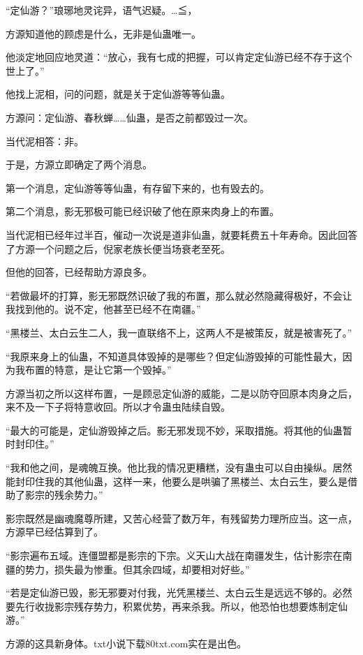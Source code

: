 
\begin{this_body}

“定仙游？”琅琊地灵诧异，语气迟疑。…≦，

方源知道他的顾虑是什么，无非是仙蛊唯一。

他淡定地回应地灵道：“放心，我有七成的把握，可以肯定定仙游已经不存于这个世上了。”

他找上泥相，问的问题，就是关于定仙游等等仙蛊。

方源问：定仙游、春秋蝉……仙蛊，是否之前都毁过一次。

当代泥相答：非。

于是，方源立即确定了两个消息。

第一个消息，定仙游等等仙蛊，有存留下来的，也有毁去的。

第二个消息，影无邪极可能已经识破了他在原来肉身上的布置。

当代泥相已经年过半百，催动一次说是道非仙蛊，就要耗费五十年寿命。因此回答了方源一个问题之后，倪家老族长便当场衰老至死。

但他的回答，已经帮助方源良多。

“若做最坏的打算，影无邪既然识破了我的布置，那么就必然隐藏得极好，不会让我找到他的。说不定，他甚至已经不在南疆。”

“黑楼兰、太白云生二人，我一直联络不上，这两人不是被策反，就是被害死了。”

“我原来身上的仙蛊，不知道具体毁掉的是哪些？但定仙游毁掉的可能性最大，因为我布置的特意，是让它第一个毁掉。”

方源当初之所以这样布置，一是顾忌定仙游的威能，二是以防夺回原本肉身之后，来不及一下子将特意收回。所以才令蛊虫陆续自毁。

“最大的可能是，定仙游毁掉之后。影无邪发现不妙，采取措施。将其他的仙蛊暂时封印住。”

“我和他之间，是魂魄互换。他比我的情况更糟糕，没有蛊虫可以自由操纵。居然能封印住我的其他仙蛊，这样一来，他要么是哄骗了黑楼兰、太白云生，要么是借助了影宗的残余势力。”

影宗既然是幽魂魔尊所建，又苦心经营了数万年，有残留势力理所应当。这一点，方源早已经估算到了。

“影宗遍布五域。连僵盟都是影宗的下宗。义天山大战在南疆发生，估计影宗在南疆的势力，损失最为惨重。但其余四域，却要相对好些。”

“若是定仙游已毁，影无邪要对付我，光凭黑楼兰、太白云生是远远不够的。必然要先行收拢影宗残存势力，积累优势，再来杀我。所以，他恐怕也想要炼制定仙游。”

方源的这具新身体。txt小说下载80txt.com实在是出色。


\end{this_body}

